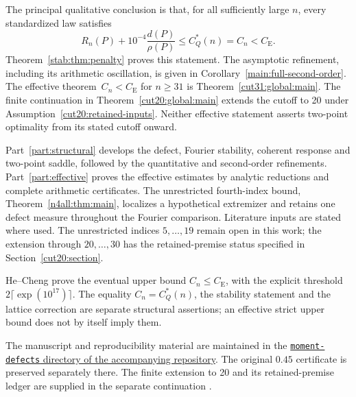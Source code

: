 \documentclass[11pt,a4paper]{article}
\numberwithin{equation}{section}
\theoremstyle{definition}
\theoremstyle{remark}
\newcommand{\CE}{C_{\mathrm E}}
\begin{document}
The principal qualitative conclusion is that, for all sufficiently
large \(n\), every standardized law satisfies
\[
 R_n(P)+10^{-4}\frac{d(P)}{\rho(P)}\le C_Q^*(n)=C_n<C_{\mathrm E}.
\]
Theorem~\ref{stab:thm:penalty} proves this statement. The asymptotic
refinement, including its arithmetic oscillation, is given in
Corollary~\ref{main:full-second-order}. The effective theorem
\(\,C_n<C_{\mathrm E}\) for \(n\ge31\) is
Theorem~\ref{cut31:global:main}. The finite continuation in
Theorem~\ref{cut20:global:main} extends the cutoff to 20 under
Assumption~\ref{cut20:retained-inputs}. Neither effective statement
asserts two-point optimality from its stated cutoff onward.

Part~\ref{part:structural} develops the defect, Fourier stability,
coherent response and two-point saddle, followed by the quantitative
and second-order refinements. Part~\ref{part:effective} proves the
effective estimates by analytic reductions and complete arithmetic
certificates. The unrestricted fourth-index bound,
Theorem~\ref{n4all:thm:main}, localizes a hypothetical extremizer and
retains one defect measure throughout the Fourier comparison.
Literature inputs are stated where used. The unrestricted indices
\(5,\ldots,19\) remain open in this work; the extension through
\(20,\ldots,30\) has the retained-premise status specified in
Section~\ref{cut20:section}.

He--Cheng \cite{HC2026v3} prove the eventual upper bound
\(C_n\le\CE\), with the explicit threshold
\(2\lceil\exp(10^{17})\rceil\). The equality
\(C_n=C_Q^*(n)\), the stability statement and the lattice correction
are separate structural assertions; an effective strict upper bound
does not by itself imply them.

The manuscript and reproducibility material are maintained in the
\href{https://github.com/rodziewiczk/berry-esseen-045-certificate/tree/main/moment-defects}
{\texttt{moment-defects} directory of the accompanying repository}.
The original \(0.45\) certificate is preserved separately there.
The finite extension to 20 and its retained-premise ledger are supplied
in the separate continuation \cite{Cutoff20Continuation}.

\clearpage
\begingroup
\normalsize
\raggedright
\setlength{\parskip}{0pt}
\setlength{\abovedisplayskip}{4pt}
\setlength{\belowdisplayskip}{4pt}
\setlength{\abovedisplayshortskip}{3pt}
\setlength{\belowdisplayshortskip}{3pt}
\end{document}
